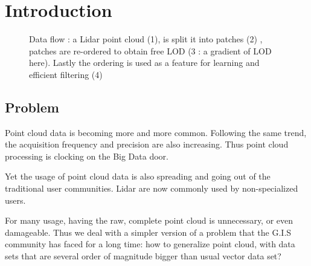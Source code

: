 

\section{Introduction}

\begin{figure}[t!]
	\begin{center}
		\caption{Data flow : a Lidar point cloud (1), is split it into patches (2) , patches are re-ordered to obtain free LOD (3 : a gradient of LOD here). Lastly the ordering is used as a feature for learning and efficient filtering (4) } 
		\label{fig:banner_image}
	\end{center}
\end{figure} 

	\subsection{Problem}  
		Point cloud data is becoming more and more common. Following the same trend, the acquisition frequency and precision are also increasing.
		Thus point cloud processing is clocking on the Big Data door.
		
		Yet the usage of point cloud data is also spreading and going out of the traditional user communities. 
		Lidar are now commonly used by non-specialized users. 
		
		
		For many usage, having the raw, complete point cloud is unnecessary, or even damageable.
		Thus we deal with a simpler version of a problem that the G.I.S community has faced for a long time: how to generalize point cloud, with data sets that are several order of magnitude bigger than usual vector data set?
		
